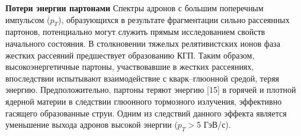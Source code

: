 \begin{comment}
	\begin{figure}[] 
		\center
		\includegraphics [width = 0.5\linewidth] {Intro/Strangeness_enhancement.png}
		\caption{Механизм образования странных кварков, основанный на модели термальной КХД.}
		\label{img:StrangenessEnhancement}  
	\end{figure}
\end{comment}
\begin{comment}
	\textbf{Динамика столкновения и уравнение состояния}
	Ожидается, что изучение коллективного движения образовавшихся адронов в конечном состоянии даст информацию о динамике столкновений тяжелых ионов. С гидродинамической точки зрения на столкновения,
	коллективное движение определяется градиентом давления сжатой ядерной материи на ранней стадии столкновения. В случае фазового перехода от порядковой ядерной к кварк-глюонной плазме ожидается соответствующее смягчение уравнения состояния за счет увеличения числа степеней свободы [4]. Таким образом, наблюдение за коллективным движением крайне важно для подтверждения гидродинамического описания динамики. Если фазовый переход первого рода, то уравнение состояния будет наиболее «мягким» при критической температуре Tc. Ожидается, что такое смягчение повлияет на динамическую эволюцию системы, поскольку внутреннее давление падает при Tc. Таким образом, наблюдение за функцией возбуждения поперечного коллективного потока может служить зондом для формирования КГП; падение функции возбуждения коллективного потока свидетельствует о пороговой энергии образования КГП.
\end{comment}

\textbf{Потери энергии партонами}
Спектры адронов с большим поперечным импульсом ($p_T$), образующихся в результате фрагментации сильно рассеянных партонов, потенциально могут служить прямым исследованием свойств начального состояния. В столкновении тяжелых релятивистских ионов фаза жестких рассеяний предшествует образованию КГП. Таким образом, высокоэнергетичные партоны, участвовавшие в жестких рассеяниях, впоследствии испытывают взаимодействие с кварк–глюонной средой, теряя энергию. Предположительно, партоны теряют энергию [15] в горячей и плотной ядерной материи в следствии глюонного тормозного излучения, эффективно гасящего образованные струи. Одним из следствий данного эффекта является уменьшение выхода адронов высокой энергии ($p_T > $5 ГэВ/с). 

